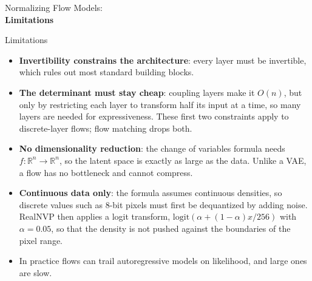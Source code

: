 \begin{frame}[allowframebreaks]{}
    \LARGE Normalizing Flow Models: \\[1.5ex] \textbf{Limitations}
\end{frame}

\begin{frame}[allowframebreaks]{Limitations}
    \begin{itemize}
        \item \textbf{Invertibility constrains the architecture}: every layer must be invertible, which rules out most standard building blocks.
        \item \textbf{The determinant must stay cheap}: coupling layers make it $O(n)$, but only by restricting each layer to transform half its input at a time, so many layers are needed for expressiveness. These first two constraints apply to discrete-layer flows; flow matching drops both.
        \item \textbf{No dimensionality reduction}: the change of variables formula needs $f:\mathbb{R}^n \rightarrow \mathbb{R}^n$, so the latent space is exactly as large as the data. Unlike a VAE, a flow has no bottleneck and cannot compress.
        \item \textbf{Continuous data only}: the formula assumes continuous densities, so discrete values such as 8-bit pixels must first be dequantized by adding noise. RealNVP then applies a logit transform, $\mathrm{logit}(\alpha + (1-\alpha)x/256)$ with $\alpha = 0.05$, so that the density is not pushed against the boundaries of the pixel range.
        \item In practice flows can trail autoregressive models on likelihood, and large ones are slow.
    \end{itemize}
\end{frame}